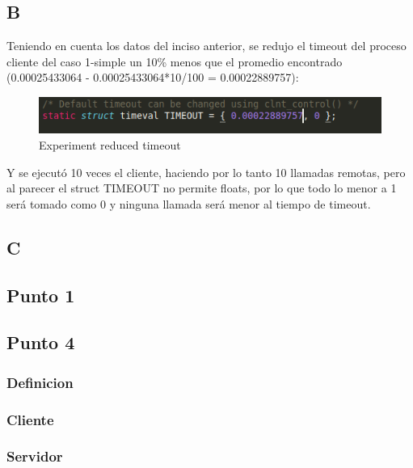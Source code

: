 \documentclass[12pt,journal,compsoc]{IEEEtran}
\begin{document}
\subsection{B}
Teniendo en cuenta los datos del inciso anterior, se redujo el timeout del proceso cliente del caso 1-simple un 10\% menos que el promedio encontrado (0.00025433064 - 0.00025433064*10/100 = 0.00022889757):

\label{reduced-timeout}
\begin{figure}[H]
\centering
\includegraphics[width=125mm]{capturas/reduced-timeout.png}
\caption{Experiment reduced timeout\label{Reduced timeout}}
\end{figure}


Y se ejecutó 10 veces el cliente, haciendo por lo tanto 10 llamadas remotas, pero al parecer el struct TIMEOUT no permite floats, por lo que todo lo menor a 1 será tomado como 0 y ninguna llamada será menor al tiempo de timeout.

\subsection{C}


\newpage
\onecolumn
{}
\subsection{Punto 1}
\label{local-procedures}


\subsection{Punto 4}
\subsubsection{Definicion}
\label{punto-4-definicion}


\subsubsection{Cliente}
\label{punto-4-cliente}



\subsubsection{Servidor}
\label{punto-4-servidor}

\end{document}
